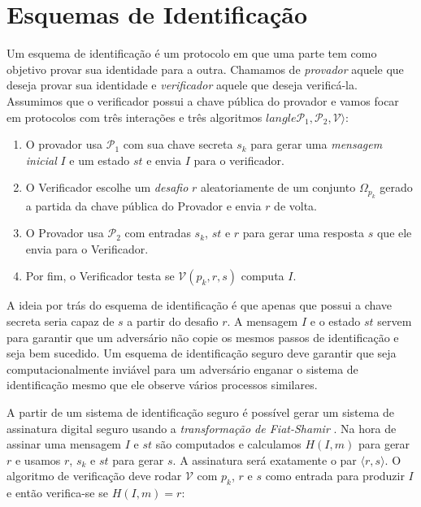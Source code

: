 \section{Esquemas de Identificação}
\label{sec:esqu-de-ident}

Um esquema de identificação é um protocolo em que uma parte tem como objetivo provar sua identidade para a outra.
Chamamos de {\em provador} aquele que deseja provar sua identidade e {\em verificador} aquele que deseja verificá-la.
Assumimos que o verificador possui a chave pública do provador e vamos focar em protocolos com três interações e três algoritmos $langle \mathcal{P}_1, \mathcal{P}_2, \mathcal{V} \rangle$:
\begin{enumerate}
\item O provador usa $\mathcal{P}_1$ com sua chave secreta $s_k$ para gerar uma {\em mensagem inicial} $I$ e um estado $st$ e envia $I$ para o verificador.
\item O Verificador escolhe um {\em desafio} $r$ aleatoriamente de um conjunto $\Omega_{p_k}$ gerado a partida da chave pública do Provador e envia $r$  de volta.
\item O Provador usa $\mathcal{P}_2$ com entradas $s_k$, $st$ e $r$ para gerar uma resposta $s$ que ele envia para o Verificador.
\item Por fim, o Verificador testa se $\mathcal{V}(p_k, r, s)$ computa $I$.
\end{enumerate}


A ideia por trás do esquema de identificação é que apenas que possui a chave secreta seria capaz de $s$ a partir do desafio $r$.
A mensagem $I$ e o estado $st$ servem para garantir que um adversário não copie os mesmos passos de identificação e seja bem sucedido.
Um esquema de identificação seguro deve garantir que seja computacionalmente inviável para um adversário enganar o sistema de identificação mesmo que ele observe vários processos similares.

A partir de um sistema de identificação seguro é possível gerar um sistema de assinatura digital seguro usando a {\em transformação de Fiat-Shamir} \cite{Fiat87}.
Na hora de assinar uma mensagem $I$ e $st$ são computados e calculamos $H(I, m)$ para gerar $r$ e usamos $r$, $s_k$ e $st$ para gerar $s$.
A assinatura será exatamente o par $\langle r, s \rangle$.
O algoritmo de verificação deve rodar $\mathcal{V}$ com $p_k$, $r$ e $s$ como entrada para produzir $I$ e então verifica-se se $H(I, m) = r$: 

